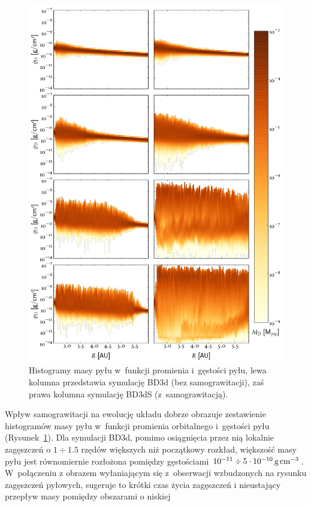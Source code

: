 \begin{figure} 
  \centering
  \includegraphics[height=0.9\textheight]{figures/hists2d}
  \caption{Histogramy masy pyłu w~funkcji promienia i~gęstości pyłu, lewa
  kolumna przedstawia symulację BD3d (bez samograwitacji), zaś prawa kolumna
  symulację BD3dS (z~samograwitacją).}
  \label{fig:hists} 
\end{figure}
%
Wpływ samograwitacji na ewolucję układu dobrze obrazuje zestawienie
histogramów masy pyłu w~funkcji promienia orbitalnego i~gęstości pyłu
(Rysunek~\ref{fig:hists}). Dla symulacji BD3d, pomimo osiągnięcia przez nią
lokalnie zagęszczeń o $1\div1.5$ rzędów większych niż początkowy rozkład,
większość masy pyłu jest równomiernie rozłożona pomiędzy gęstościami $10^{-11}
\div 5\cdot10^{-10}\hbox{$\thinspace\textrm{g}$}\hbox{$\thinspace\textrm{cm}$}^{-3}$. W~połączeniu z obrazem wyłaniającym się
z~obserwacji wzbudzonych na rysunku zagęszczeń pyłowych, sugeruje to krótki czas
życia zagęszczeń i nieustający przepływ masy pomiędzy obszarami o niskiej
